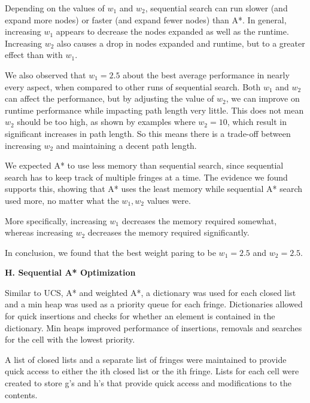 \documentclass[12pt, letterpaper]{article}
\begin{document}
\bigskip

Depending on the values of $w_1$ and $w_2$, sequential search can run slower (and expand more nodes) or faster (and expand fewer nodes) than A*. In general, increasing $w_1$ appears to decrease the nodes expanded as well as the runtime. Increasing $w_2$ also causes a drop in nodes expanded and runtime, but to a greater effect than with $w_1$.  

We also observed that $w_1=2.5$ about the best average performance in nearly every aspect, when compared to other runs of sequential search. Both $w_1$ and $w_2$ can affect the performance, but by adjusting the value of $w_2$, we can improve on runtime performance while impacting path length very little. This does not mean $w_2$ should be too high, as shown by examples where $w_2 = 10$, which result in significant increases in path length. So this means there is a trade-off between increasing $w_2$ and maintaining a decent path length.

\bigskip

We expected A* to use less memory than sequential search, since sequential search has to keep track of multiple fringes at a time. The evidence we found supports this, showing that A* uses the least memory while sequential A* search used more, no matter what the $w_1,w_2$ values were.

More specifically, increasing $w_1$ decreases the memory required somewhat, whereas increasing $w_2$ decreases the memory required significantly.

\bigskip

In conclusion, we found that the best weight paring to be $w_1=2.5$ and $w_2=2.5$.

\pagebreak %

\noindent \textbf{H. Sequential A* Optimization}

Similar to UCS, A* and weighted A*, a dictionary was used for each closed list and a min heap was used as a priority queue for each fringe. Dictionaries allowed for quick insertions and checks for whether an element is contained in the dictionary. Min heaps improved performance of insertions, removals and searches for the cell with the lowest priority. 

A list of closed lists and a separate list of fringes were maintained to provide quick access to either the ith closed list or the ith fringe. Lists for each cell were created to store g's and h's that provide quick access and modifications to the contents.
\end{document}
